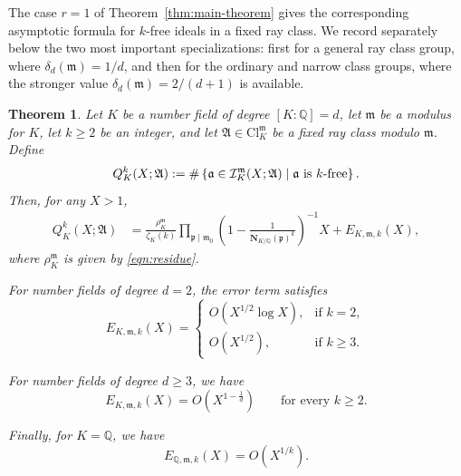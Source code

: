 \documentclass[11pt, reqno]{amsart}
\numberwithin{equation}{section}
\newtheorem{theorem}{Theorem}[section]
\newcommand{\suchthat}{\;\ifnum\currentgrouptype=16 \middle\fi|\;}
\newcommand{\Q}{\mathbb{Q}}
\newcommand{\Nrm}[2]{\mathbf{N}_{#1}(#2)}
\theoremstyle{definition}
\begin{document}
The case $r=1$ of Theorem~\ref{thm:main-theorem} gives the
corresponding asymptotic formula for $k$-free ideals in a fixed ray
class. We record separately below the two most important
specializations: first for a general ray class group, where
$\delta_d(\mathfrak{m})=1/d$, and then for the ordinary and narrow
class groups, where the stronger value
$\delta_d(\mathfrak{m})=2/(d+1)$ is available.




\begin{theorem}\label{thm:k-free-ideals-in-ray-classes}
Let $K$ be a number field of degree $[K:\Q]=d$, let $\mathfrak{m}$
be a modulus for $K$, let $k\geq2$ be an integer, and let
$\mathfrak{A}\in\mathrm{Cl}_K^{\mathfrak{m}}$ be a fixed ray class
modulo $\mathfrak{m}$. Define
\begin{equation*}
Q_K^k(X;\mathfrak{A})
:=
\#\left\{
\mathfrak{a}\in
\mathcal{I}_K^{\mathfrak{m}}(X;\mathfrak{A})
\suchthat
\mathfrak{a}\text{ is $k$-free}
\right\}.
\end{equation*}
Then, for any $X>1$,
\begin{align}\label{eqn:k-free-ideals-ray-class-asymptotic}
Q_K^k(X;\mathfrak{A})
&=
\frac{\rho_K^{\mathfrak{m}}}{\zeta_K(k)}
\prod_{\mathfrak{p}\mid\mathfrak{m}_0}
\left(
1-\frac{1}{\Nrm{K/\Q}{\mathfrak{p}}^k}
\right)^{-1}
X
+
E_{K,\mathfrak{m},k}(X),
\end{align}
where $\rho_K^{\mathfrak{m}}$ is given by
\eqref{eqn:residue}.

For number fields of degree $d=2$, the error term satisfies
\[
E_{K,\mathfrak{m},k}(X)
=
\begin{cases}
O\left(X^{1/2}\log X\right),
&
\text{if } k=2,
\\[6pt]
O\left(X^{1/2}\right),
&
\text{if } k\geq3.
\end{cases}
\]

For number fields of degree $d\geq3$, we have
\[
E_{K,\mathfrak{m},k}(X)
=
O\left(X^{1-\frac1d}\right)
\qquad
\text{for every }k\geq2.
\]

Finally, for $K=\Q$, we have
\[
E_{\Q,\mathfrak{m},k}(X)
=
O\left(X^{1/k}\right).
\]
\end{theorem}
\end{document}

